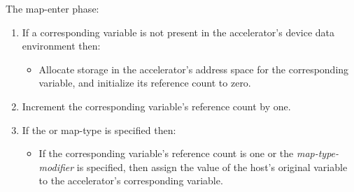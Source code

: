 The map-enter phase: \begin{enumerate}

  \item If a corresponding variable is not present in the accelerator's device
  data environment then: \begin{itemize}
     
    \item Allocate storage in the accelerator's address space for the
    corresponding variable, and initialize its reference count to zero.

  \end{itemize}

  \item Increment the corresponding variable's reference count by one.

  \item If the  or  map-type is specified then:
  \begin{itemize}

    \item If the corresponding variable's reference count is one or the
     \emph{map-type-modifier} is specified, then assign the value of the
    host's original variable to the accelerator's corresponding variable.

  \end{itemize}

\end{enumerate}

